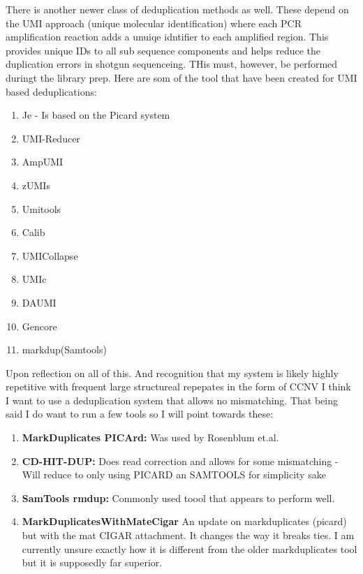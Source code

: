 \documentclass{article}
\begin{document}
    There is another newer class of deduplication methods as well.   These depend on the UMI approach (unique molecular identification) where each PCR amplification reaction adds a unuiqe idntifier to each amplified region.  This provides unique IDs to all sub sequence components and helps reduce the duplication errors in shotgun sequenceing.   THis must, however, be performed duringt the library prep.
    Here are som of the tool that have been created for UMI based deduplications:
    \begin{enumerate}
        \item Je - Is based on the Picard system 
        \item UMI-Reducer 
        \item AmpUMI
        \item zUMIs
        \item Umitools
        \item Calib 
        \item UMICollapse
        \item UMIc 
        \item DAUMI 
        \item Gencore 
        \item markdup(Samtools)
    \end{enumerate}

    Upon reflection on all of this.   And recognition that my system is likely highly repetitive with frequent large structureal repepates in the form of CCNV I think I want to use a deduplication system that allows no mismatching.  That being said I do want to run a few tools so I will point towards these:
    \begin{enumerate}
        \item \textbf{MarkDuplicates PICArd:} Was used by Rosenblum et.al.
        \item \textbf{CD-HIT-DUP:}  Does read correction and allows for some mismatching - Will reduce to only using PICARD an SAMTOOLS for simplicity sake
        \item \textbf{SamTools rmdup:}  Commonly used toool that appears to perform well.
        \item \textbf{MarkDuplicatesWithMateCigar} An update on markduplicates (picard) but with the mat CIGAR attachment.   It changes the way it breaks ties.  I am currently unsure exactly how it is different from the older markduplicates tool but it is supposedly far superior.
    \end{enumerate}
\end{document}
